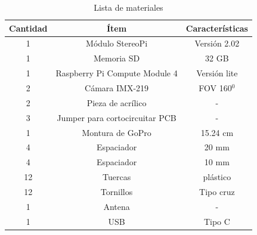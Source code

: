 \begin{table}[H]
\centering
\caption{Lista de materiales}
\label{BOM}
\begin{tabular}{|c|c|c|}
\hline
Cantidad & Ítem                           & Características             \\ \hline
1        & Módulo StereoPi                & Versión 2.02                \\ \hline
1        & Memoria SD                     & 32 GB                       \\ \hline
1        & Raspberry Pi Compute Module 4  & Versión lite                \\ \hline
2        & Cámara IMX-219                 & FOV 160$^0$                \\ \hline
2        & Pieza de acrílico              & -                           \\ \hline
3        & Jumper para cortocircuitar PCB & -                           \\ \hline
1        & Montura de GoPro               & 15.24 cm                    \\ \hline
4        & Espaciador                     & 20 mm                       \\ \hline
4        & Espaciador                     & 10 mm                       \\ \hline
12       & Tuercas                        & plástico                    \\ \hline
12       & Tornillos                      & Tipo cruz                   \\ \hline
1        & Antena                         & -                           \\ \hline
1        & USB                            & Tipo C                      \\ \hline
\end{tabular}
\end{table}